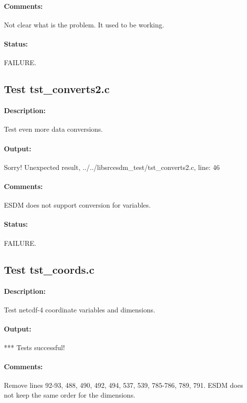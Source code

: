 \paragraph{Comments:} Not clear what is the problem. It used to be working.

\paragraph{Status:} FAILURE.

\subsection{Test tst\_converts2.c}

\paragraph{Description:} Test even more data conversions.

\paragraph{Output:} Sorry! Unexpected result, ../../libsrcesdm\_test/tst\_converts2.c, line: 46

\paragraph{Comments:} ESDM does not support conversion for variables.

\paragraph{Status:} FAILURE.

\subsection{Test tst\_coords.c}

\paragraph{Description:} Test netcdf-4 coordinate variables and dimensions.

\paragraph{Output:} *** Tests successful!

\paragraph{Comments:} Remove lines 92-93, 488, 490, 492, 494, 537, 539, 785-786, 789, 791. ESDM does not keep the same order for the dimensions.

